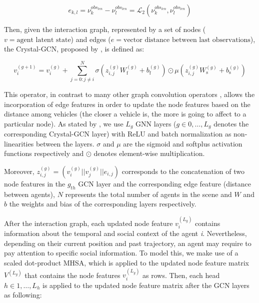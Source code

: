 \begin{equation}
	\label{eq:6_edge_gnn}
	e_{k,l} = \nu^{obs_{len}}_k - \nu^{obs_{len}}_l = \mathcal{L}_2(\nu^{obs_{len}}_k, \nu^{obs_{len}}_l)
\end{equation}

Then, given the interaction graph, represented by a set of nodes ($v = \text{agent latent state}$) and edges ($e= \text{vector distance between last observations}$), the Crystal-\ac{GCN}, proposed by \cite{xie2018crystal}, is defined as:

\begin{equation}
	v_i^{(g+1)} = v_i^{(g)} +
	\sum_{j = 0 : j \neq i }^{N} \sigma \left(z_{i,j}^{(g)} W_\mathrm{f}^{(g)} + b_\mathrm{f}^{(g)} \right)
	\odot \mu \left(z_{i,j}^{(g)} W_\mathrm{s}^{(g)} + b_\mathrm{s}^{(g)}  \right)
\end{equation}

This operator, in contrast to many other graph convolution operators \cite{zeng2021lanercnn, liang2020learning}, allows the incorporation of edge features in order to update the node features based on the distance among vehicles (the closer a vehicle is, the more is going to affect to a particular node). As stated by \cite{schmidt2022crat}, we use $L_g$ \ac{GNN} layers ($g \in 0, \dots , L_g$ denotes the corresponding Crystal-\ac{GCN} layer) with \ac{ReLU} and batch normalization as non-linearities between the layers. $\sigma$ and $\mu$ are the sigmoid and softplus activation functions respectively and $\odot$ denotes element-wise multiplication.

Moreover, $z_{i,j}^{(g)} = (v_i^{(g)} || v_j^{(g)} || e_{i,j} )$ corresponds to the concatenation of two node features in the \textit{$g_{th}$} \ac{GCN} layer and the corresponding edge feature (distance between agents), $N$ represents the total number of agents in the scene and $W$ and $b$ the weights and bias of the corresponding layers respectively.

After the interaction graph, each updated node feature $v_i^{(L_g)}$ contains information about the temporal and social context of the agent \textit{i}. Nevertheless, depending on their current position and past trajectory, an agent may require to pay attention to specific social information. To model this, we make use of a scaled dot-product \ac{MHSA}, which is applied to the updated node feature matrix $V^{(L_g)}$ that contains the node features $v_i^{(L_g)}$ as rows. Then, each head $h \in 1,\dots, L_h$ is applied to the updated node feature matrix after the \ac{GCN} layers as following:

